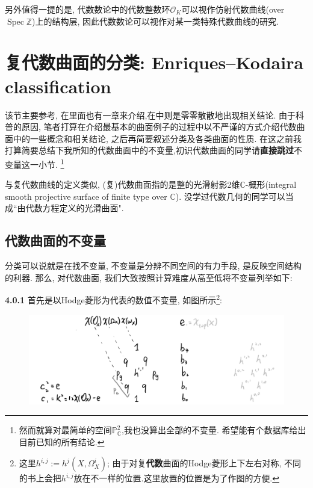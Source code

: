 \documentclass[UTF8,12pt,twoside]{article}
\theoremstyle{definition}
\newcommand{\ZZ}{\mathbb{Z}}  %
\newcommand{\CC}{\mathbb{C}}  %
\newcommand{\Spec}{\operatorname{Spec}}
\numberwithin{equation}{section}
\begin{document}
另外值得一提的是, 代数数论中的代数整数环$\mathcal{O}_K$可以视作仿射代数曲线(over $\Spec \ZZ$)上的结构层, 因此代数数论可以视作对某一类特殊代数曲线的研究.

\section{复代数曲面的分类: Enriques–Kodaira classification}
该节主要参考\cite{beauville1996complex}, 在\cite{hartshorne2013algebraic}里面也有一章来介绍,在\cite{vakil2017rising}中则是零零散散地出现相关结论. 由于科普的原因, 笔者打算在介绍最基本的曲面例子的过程中以不严谨的方式介绍代数曲面中的一些概念和相关结论, 之后再简要叙述分类及各类曲面的性质. 在这之前我打算简要总结下我所知的代数曲面中的不变量,初识代数曲面的同学请\textbf{直接跳过}不变量这一小节. \footnote{然而就算对最简单的空间$\mathbb{P}^2_{\CC}$,我也没算出全部的不变量. 希望能有个数据库给出目前已知的所有结论.}

与复代数曲线的定义类似, (复)代数曲面指的是整的光滑射影2维$\CC$-概形(integral smooth projective surface of finite type over $\CC$). 没学过代数几何的同学可以当成``由代数方程定义的光滑曲面".
\setcounter{subsection}{-1}
\subsection{代数曲面的不变量}

分类可以说就是在找不变量, 不变量是分辨不同空间的有力手段, 是反映空间结构的利器. 那么, 对代数曲面, 我们大致按照计算难度从高至低将不变量列举如下: 

\textbf{4.0.1}  首先是以Hodge菱形为代表的数值不变量, 如图所示\footnote{这里$h^{i,j}:=h^j(X,\Omega_{X}^{i})$; 由于对复\textbf{代数}曲面的Hodge菱形上下左右对称, 不同的书上会把$h^{i,j}$放在不一样的位置.这里放置的位置是为了作图的方便.}: 

\begin{figure}[ht]
	\vspace{0cm}
	\centering
	\includegraphics[width=12cm]{9-7-fig/numinv.png}
	\label{fig:numinv}
\end{figure}
\end{document}
